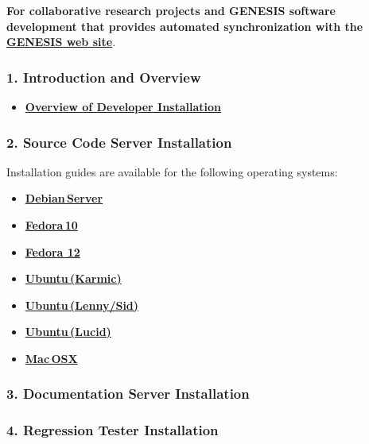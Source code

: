 \documentclass[12pt]{article}
\begin{document}
{\bf For collaborative research projects and GENESIS software development that provides automated synchronization with the \href{http://www.genesis-sim.org/}{\bf GENESIS web site}}.

\subsubsection*{1. Introduction and Overview}

\begin{itemize}
   \item[]\href{../developer-installation/developer-installation.tex}{\bf Overview of Developer Installation}
\end{itemize}

\subsubsection*{2. Source Code Server Installation}

Installation guides are available for the following operating systems:
\begin{itemize}
    \item[]\href{../installation-debian-server/installation-debian-server.tex}{\bf Debian\,Server}
    \item[]\href{../installation-fedora10/installation-fedora10.tex}{\bf Fedora\,10}
    \item[]\href{../installation-fedora12/installation-fedora12.tex}{\bf Fedora 12}
    \item[]\href{../installation-ubuntu-karmic/installation-ubuntu-karmic.tex}{\bf Ubuntu\,(Karmic)}
    \item[]\href{../installation-ubuntu-lennysid/installation-ubuntu-lennysid.tex}{\bf Ubuntu\,(Lenny/Sid)}
    \item[]\href{../installation-ubuntu-lucid/installation-ubuntu-lucid.tex}{\bf Ubuntu\,(Lucid)}
    \item[]\href{../installation-osx/installation-osx.tex}{\bf Mac\,OSX}
\end{itemize}

\subsubsection*{3. Documentation Server Installation}

\subsubsection*{4. Regression Tester Installation}
\end{document}
